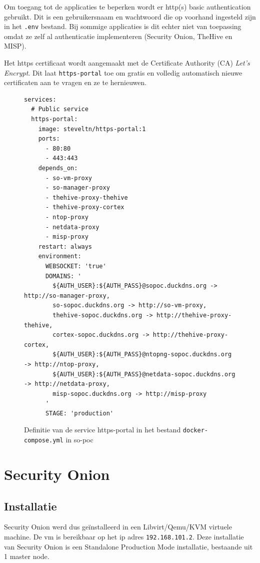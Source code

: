 \documentclass[a4paper,12pt]{report}
\begin{document}
Om toegang tot de applicaties te beperken wordt er http(s) basic authentication gebruikt.
Dit is een gebruikersnaam en wachtwoord die op voorhand ingesteld zijn in het \lstinline|.env| bestand.
Bij sommige applicaties is dit echter niet van toepassing omdat ze zelf al authenticatie implementeren (Security Onion, TheHive en MISP).

Het https certificaat wordt aangemaakt met de Certificate Authority (CA) \emph{Let's Encrypt}.
Dit laat \lstinline|https-portal| toe om gratis en volledig automatisch nieuwe certificaten aan te vragen en ze te hernieuwen.

\begin{figure}[H]
  \begin{lstlisting}
services:
  # Public service
  https-portal:
    image: steveltn/https-portal:1
    ports:
      - 80:80
      - 443:443
    depends_on:
      - so-vm-proxy
      - so-manager-proxy
      - thehive-proxy-thehive
      - thehive-proxy-cortex
      - ntop-proxy
      - netdata-proxy
      - misp-proxy
    restart: always
    environment:
      WEBSOCKET: 'true'
      DOMAINS: '
        ${AUTH_USER}:${AUTH_PASS}@sopoc.duckdns.org -> http://so-manager-proxy,
        so-sopoc.duckdns.org -> http://so-vm-proxy,
        thehive-sopoc.duckdns.org -> http://thehive-proxy-thehive,
        cortex-sopoc.duckdns.org -> http://thehive-proxy-cortex,
        ${AUTH_USER}:${AUTH_PASS}@ntopng-sopoc.duckdns.org -> http://ntop-proxy,
        ${AUTH_USER}:${AUTH_PASS}@netdata-sopoc.duckdns.org -> http://netdata-proxy,
        misp-sopoc.duckdns.org -> http://misp-proxy
      '
      STAGE: 'production'
  \end{lstlisting}
  \caption{Definitie van de service https-portal in het bestand \lstinline|docker-compose.yml| in so-poc}
  \label{fig:https-portal-compose}
\end{figure}

\section{Security Onion}
\subsection{Installatie}
Security Onion werd dus geïnstalleerd in een Libvirt/Qemu/KVM virtuele machine.
De vm is bereikbaar op het ip adres \lstinline|192.168.101.2|.
Deze installatie van Security Onion is een Standalone Production Mode installatie, bestaande uit 1 master node.
\end{document}
